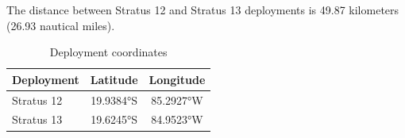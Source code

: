 
The distance between Stratus 12 and Stratus 13 deployments is 49.87 kilometers (26.93 nautical miles).

\begin{table}[ht]
\centering
\caption{Deployment coordinates}
\begin{tabular}{lcc}
\hline
\textbf{Deployment} & \textbf{Latitude} & \textbf{Longitude} \\
\hline
Stratus 12 & 19.9384°S & 85.2927°W \\
Stratus 13 & 19.6245°S & 84.9523°W \\
\hline
\end{tabular}
\end{table}

